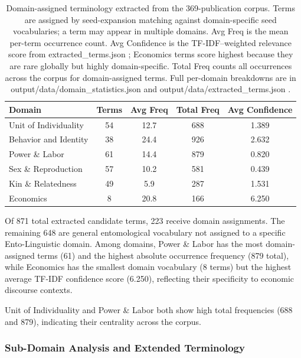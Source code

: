\documentclass[
]{article}
\numberwithin{equation}{section}
\renewcommand{\texttt}[1]{%
    \colorbox{codebg}{\color{codefg}\ttfamily #1}%
}
\begin{document}
\begin{table}[h]
\centering
\begin{tabular}{|l|c|c|c|c|}
\hline
\textbf{Domain} & \textbf{Terms} & \textbf{Avg Freq} & \textbf{Total Freq} & \textbf{Avg Confidence} \\
\hline
Unit of Individuality & 54 & 12.7 & 688 & 1.389 \\
Behavior and Identity & 38 & 24.4 & 926 & 2.632 \\
Power \& Labor & 61 & 14.4 & 879 & 0.820 \\
Sex \& Reproduction & 57 & 10.2 & 581 & 0.439 \\
Kin \& Relatedness & 49 & 5.9 & 287 & 1.531 \\
Economics & 8 & 20.8 & 166 & 6.250 \\
\hline
\end{tabular}
\caption{Domain-assigned terminology extracted from the 369-publication corpus. Terms are assigned by seed-expansion matching against domain-specific seed vocabularies; a term may appear in multiple domains. Avg Freq is the mean per-term occurrence count. Avg Confidence is the TF-IDF–weighted relevance score from \texttt{extracted\_terms.json}; Economics terms score highest because they are rare globally but highly domain-specific. Total Freq counts all occurrences across the corpus for domain-assigned terms. Full per-domain breakdowns are in \texttt{output/data/domain\_statistics.json} and \texttt{output/data/extracted\_terms.json}.}
\label{tab:terminology_extraction}
\end{table}

Of 871 total extracted candidate terms, 223 receive domain assignments.
The remaining 648 are general entomological vocabulary not assigned to a
specific Ento-Linguistic domain. Among domains, Power \& Labor has the
most domain-assigned terms (61) and the highest absolute occurrence
frequency (879 total), while Economics has the smallest domain
vocabulary (8 terms) but the highest average TF-IDF confidence score
(6.250), reflecting their specificity to economic discourse contexts.

Unit of Individuality and Power \& Labor both show high total
frequencies (688 and 879), indicating their centrality across the
corpus.

\subsubsection{Sub-Domain Analysis and Extended
Terminology}\label{sub-domain-analysis-and-extended-terminology}
\end{document}
